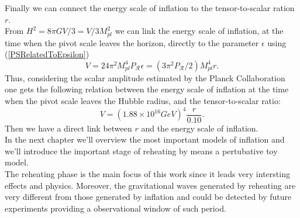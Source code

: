 \documentclass[11pt,a4paper,twoside]{book}
\begin{document}
Finally we can connect the energy scale of inflation to the tensor-to-scalar ration $ r $.\\
From $ H^{2}=8\pi GV/3 = V/3M_{pl}^{2}$ we can link the energy scale of inflation, at the time when the pivot scale leaves the horizon, directly to the parameter $\epsilon$ using (\ref{PSRelatedToEpsilon})
\begin{equation}
	V=24\pi^{2}M_{pl}^{4}P_{\mathcal{R}}\epsilon =(3\pi^{2}P_{\mathcal{R}}/2)M_{pl}^{4}r.
\end{equation}
Thus, considering  the scalar amplitude estimated  by the Planck Collaboration \cite{Plank2015:Chap1} one gets  the following relation between the energy scale of inflation at the time when the pivot scale leaves the Hubble radius, and the tensor-to-scalar ratio:
\begin{equation}
	\label{energyScaleInflation-r}
	V=(1.88\times10^{16}GeV)^{4}\frac{r}{0.10}.
\end{equation}
Then we have a direct link between $ r $ and the energy scale of inflation.\\

In the next chapter we'll overview the most important models of inflation and we'll introduce the important stage of reheating by means a pertubative toy model.\\
The reheating phase is the main focus of this work since it leads very intersting effects and physics. Moreover, the gravitational waves generated by reheating are very different from those generated by inflation and could be detected by future experiments providing a observational window of such period.
\end{document}
